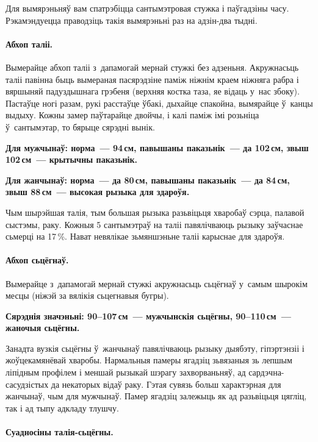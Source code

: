 Для вымярэньняў вам спатрэбіцца сантымэтровая стужка і паўгадзіны часу. Рэкамэндуецца праводзіць такія вымярэньні раз на адзін-два тыдні.

\paragraph{Абхоп таліі.} Вымерайце абхоп таліі з~дапамогай мернай стужкі без адзеньня. Акружнасьць таліі павінна быць вымераная пасярэдзіне паміж ніжнім краем ніжняга рабра і вяршыняй падуздышнага грэбеня (верхняя костка таза, яе відаць у~нас збоку). Пастаўце ногі разам, рукі расстаўце ўбакі, дыхайце спакойна, вымярайце ў~канцы выдыху. Кожны замер паўтарайце двойчы, і калі паміж імі розьніца ў~сантымэтар, то бярыце сярэдні вынік.

\textbf{Для мужчынаў: норма~--- 94\,см, павышаны паказьнік~--- да 102\,см, звыш 102\,см~--- крытычны паказьнік.}

\textbf{Для жанчынаў: норма~--- да 80\,см, павышаны паказьнік~--- да 84\,см, звыш 88\,см~--- высокая рызыка для здароўя.}

Чым шырэйшая талія, тым большая рызыка разьвіцьця хваробаў сэрца, палавой сыстэмы, раку. Кожныя 5 сантымэтраў на таліі павялічваюць рызыку заўчаснае сьмерці на 17\,\%. Нават невялікае зьмяншэньне таліі карыснае для здароўя.

\paragraph{Абхоп сьцёгнаў.} Вымерайце з~дапамогай мернай стужкі акружнасьць сьцёгнаў у~самым шырокім месцы (ніжэй за вялікія сьцегнавыя бугры). 

\textbf{Сярэднія значэньні: 90--107\,см~--- мужчынскія сьцёгны, 90--110\,см~--- жаночыя сьцёгны.}

Занадта вузкія сьцёгны ў~жанчынаў павялічваюць рызыку дыябэту, гіпэртэнзіі і жоўцекамянёвай хваробы. Нармальныя памеры ягадзіц зьвязаныя зь лепшым ліпідным профілем і меншай рызыкай шэрагу захворваньняў, ад сардэчна-сасудзістых да некаторых відаў раку. Гэтая сувязь больш характэрная для жанчынаў, чым для мужчынаў. Памер ягадзіц залежыць як ад разьвіцьця цягліц, так і ад тыпу адкладу тлушчу.

\paragraph{Суадносіны талія-сьцёгны.}~\nopagebreak[4]

